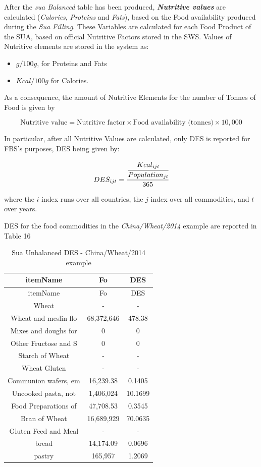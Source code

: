 \documentclass[]{article}
\providecommand{\tightlist}{%
  \setlength{\itemsep}{0pt}\setlength{\parskip}{0pt}}
\begin{document}
After the \emph{sua Balanced} table has been produced,
\textbf{\emph{Nutritive values}} are calculated (\emph{Calories},
\emph{Proteins} and \emph{Fats}), based on the Food availability
produced during the \emph{Sua Filling}. These Variables are calculated
for each Food Product of the SUA, based on official Nutritive Factors
stored in the SWS. Values of Nutritive elements are stored in the system
as:

\begin{itemize}
\tightlist
\item
  \(g/100g\), for Proteins and Fats
\item
  \(Kcal/100g\) for Calories.
\end{itemize}

As a consequence, the amount of Nutritive Elements for the number of
Tonnes of Food is given by

\begin{equation}
\label{eq:Nutritive}
\text{Nutritive value} = \text{Nutritive factor} \times \text{Food availability (tonnes)} \times 10,000
\end{equation}

In particular, after all Nutritive Values are calculated, only DES is
reported for FBS's purposes, DES being given by:

\begin{equation}
\label{eq:des}
 DES_{ijt} = \cfrac{\cfrac{Kcal_{ijt}}{Population_{jt}}}{365}
\end{equation}

where the \(i\) index runs over all countries, the \(j\) index over all
commodities, and \(t\) over years.

DES for the food commodities in the \emph{China/Wheat/2014} example are
reported in Table 16

\begin{longtable}[]{@{}ccc@{}}
\caption{Sua Unbalanced DES - China/Wheat/2014 example}\tabularnewline
\toprule
itemName & Fo & DES\tabularnewline
\midrule
\endfirsthead
\toprule
itemName & Fo & DES\tabularnewline
\midrule
\endhead
Wheat & - & -\tabularnewline
Wheat and meslin flo & 68,372,646 & 478.38\tabularnewline
Mixes and doughs for & 0 & 0\tabularnewline
Other Fructose and S & 0 & 0\tabularnewline
Starch of Wheat & - & -\tabularnewline
Wheat Gluten & - & -\tabularnewline
Communion wafers, em & 16,239.38 & 0.1405\tabularnewline
Uncooked pasta, not & 1,406,024 & 10.1699\tabularnewline
Food Preparations of & 47,708.53 & 0.3545\tabularnewline
Bran of Wheat & 16,689,929 & 70.0635\tabularnewline
Gluten Feed and Meal & - & -\tabularnewline
bread & 14,174.09 & 0.0696\tabularnewline
pastry & 165,957 & 1.2069\tabularnewline
\bottomrule
\end{longtable}
\end{document}
